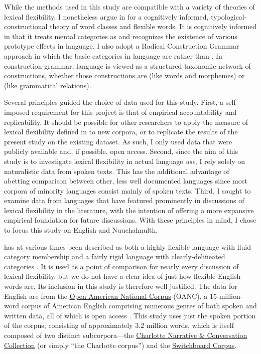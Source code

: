 While the methods used in this study are compatible with a variety of theories of lexical flexibility, I nonetheless argue in  for a cognitively informed, typological-constructional theory of word classes and flexible words. It is cognitively informed in that it treats mental categories as  and recognizes the existence of various prototype effects in language. I also adopt a Radical Construction Grammar approach \parencite{Croft2001b} in which the basic categories in language are  rather than  . In construction grammar, language is viewed as a structured taxonomic network of constructions, whether those constructions are  (like words and morphemes) or  (like grammatical relations).

Several principles guided the choice of data used for this study. First, a self-imposed requirement for this project is that of empirical accountability and replicability. It should be possible for other researchers to apply the measure of lexical flexibility defined in  to new corpora, or to replicate the results of the present study on the existing dataset. As such, I only used data that were publicly available and, if possible, open access. Second, since the aim of this study is to investigate lexical flexibility in actual language \emph{use}, I rely solely on naturalistic data from spoken texts. This has the additional advantage of abetting comparison between other, less well documented languages since most corpora of minority languages consist mainly of spoken texts. Third, I sought to examine data from languages that have featured prominently in discussions of lexical flexibility in the literature, with the intention of offering a more expansive empirical foundation for future discussions. With these principles in mind, I chose to focus this study on English and Nuuchahnulth.

 has at various times been described as both a highly flexible language with fluid category membership \parencites[47--48]{Crystal1967}{Vonen1994}[111]{Farrell2001}{Cannon1985} and a fairly rigid language with clearly-delineated categories \parencites[710]{Rijkhoff2007}[4, 11, 12]{SchachterShopen2007}[122, 126]{Velupillai2012}. It is used as a point of comparison for nearly every discussion of lexical flexibility, but we do not have a clear idea of just how flexible English words are. Its inclusion in this study is therefore well justified. The data for English are from the \href{http://www.anc.org/}{Open American National Corpus} (OANC), a 15-million-word corpus of American English comprising numerous genres of both spoken and written data, all of which is open access \parencite{OANC}. This study uses just the spoken portion of the corpus, consisting of approximately 3.2 million words, which is itself composed of two distinct subcorpora—the \href{https://newsouthvoices.uncc.edu}{Charlotte Narrative \& Conversation Collection} (or simply \enquote{the Charlotte corpus}) and the \href{https://catalog.ldc.upenn.edu/LDC97S62}{Switchboard Corpus}.

